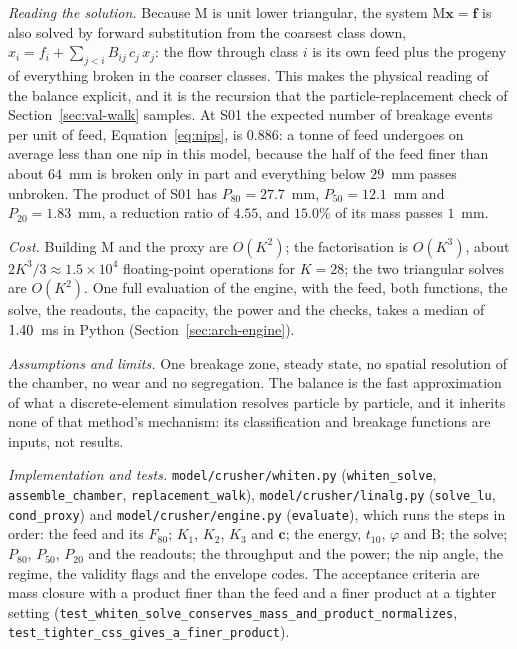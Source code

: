 \emph{Reading the solution.} Because $\mathrm M$ is unit lower triangular, the system $\mathrm M\mathbf x=\mathbf f$ is also solved by
forward substitution from the coarsest class down, $x_i = f_i + \sum_{j<i}B_{ij}\,c_j\,x_j$: the flow through class $i$ is its own feed plus the
progeny of everything broken in the coarser classes. This makes the physical reading of the balance explicit, and it is the recursion that the
particle-replacement check of Section~\ref{sec:val-walk} samples. At S01 the expected number of breakage events per unit of feed,
Equation~\eqref{eq:nips}, is $0.886$: a tonne of feed undergoes on average less than one nip in this model, because the half of the feed finer
than about $64$~mm is broken only in part and everything below $29$~mm passes unbroken. The product of S01 has $P_{80}=27.7$~mm, $P_{50}=12.1$~mm and
$P_{20}=1.83$~mm, a reduction ratio of $4.55$, and $15.0\%$ of its mass passes $1$~mm.

\emph{Cost.} Building $\mathrm M$ and the proxy are $O(K^2)$; the factorisation is $O(K^3)$, about $2K^3/3\approx1.5\times10^{4}$
floating-point operations for $K=28$; the two triangular solves are $O(K^2)$. One full evaluation of the engine, with the feed, both
functions, the solve, the readouts, the capacity, the power and the checks, takes a median of $1.40$~ms in Python
(Section~\ref{sec:arch-engine}).

\emph{Assumptions and limits.} One breakage zone, steady state, no spatial resolution of the chamber, no wear and no segregation. The
balance is the fast approximation of what a discrete-element simulation resolves particle by particle, and it inherits none of that
method's mechanism: its classification and breakage functions are inputs, not results.

\emph{Implementation and tests.} \texttt{model/\allowbreak{}crusher/\allowbreak{}whiten.py} (\texttt{whiten\_solve}, \texttt{assemble\_chamber},
\texttt{replacement\_walk}), \texttt{model/\allowbreak{}crusher/\allowbreak{}linalg.py} (\texttt{solve\_lu}, \texttt{cond\_proxy}) and
\texttt{model/\allowbreak{}crusher/\allowbreak{}engine.py} (\texttt{evaluate}), which runs the steps in order: the feed and its $F_{80}$; $K_1$, $K_2$, $K_3$ and
$\mathbf c$; the energy, $t_{10}$, $\varphi$ and $\mathrm B$; the solve; $P_{80}$, $P_{50}$, $P_{20}$ and the readouts; the throughput
and the power; the nip angle, the regime, the validity flags and the envelope codes. The acceptance criteria are mass closure with a
product finer than the feed and a finer product at a tighter setting (\texttt{test\_whiten\_solve\_conserves\_mass\_and\_product\_normalizes},
\texttt{test\_tighter\_css\_gives\_a\_finer\_product}).

